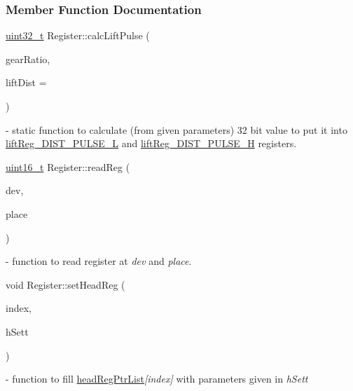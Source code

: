 {\subsubsection{Member Function Documentation}
\mbox{\label{classRegister_a72e4a0b4645d2afa608d263ece004dec}} 
{\footnotesize\ttfamily \mbox{\hyperlink{settings_8h_a4196118492a3b1493c81f250e90af775}{uint32\+\_\+t}} Register\+::\texorpdfstring{calc\+Lift\+Pulse}{calcLiftPulse} (\begin{DoxyParamCaption}\item[{\mbox{\hyperlink{settings_8h_a017dd44e68049ffdd31500a8cd01ba68}{uint16\+\_\+t}}}]{gear\+Ratio,  }\item[{\mbox{\hyperlink{settings_8h_a017dd44e68049ffdd31500a8cd01ba68}{uint16\+\_\+t}}}]{lift\+Dist = {} }\end{DoxyParamCaption})\hspace{0.3cm}{\ttfamily [static]}} - static function to calculate (from given parameters) 32 bit value to put it into \hyperlink{classRegister_a6b7cab4f601efc139a6589f92bdd97eaa3127f76d6d68960f34822218e5231d44}{lift\+Reg\+\_\+\+D\+I\+S\+T\+\_\+\+P\+U\+L\+S\+E\+\_\+L} and \hyperlink{classRegister_a6b7cab4f601efc139a6589f92bdd97eaa1f101c522eda2ec92173d127b93ae311}{lift\+Reg\+\_\+\+D\+I\+S\+T\+\_\+\+P\+U\+L\+S\+E\+\_\+H} registers.

\mbox{\label{classRegister_a5d9ef3f36154606c34d829e77daa1e32}} 
{\footnotesize\ttfamily \mbox{\hyperlink{settings_8h_a017dd44e68049ffdd31500a8cd01ba68}{uint16\+\_\+t}} Register\+::\texorpdfstring{read\+Reg}{readReg} (\begin{DoxyParamCaption}\item[{\mbox{\hyperlink{settings_8h_a48091a1e52849b0871df2f7081be2e38}{uint8\+\_\+t}}}]{dev,  }\item[{\mbox{\hyperlink{settings_8h_a48091a1e52849b0871df2f7081be2e38}{uint8\+\_\+t}}}]{place }\end{DoxyParamCaption})} - function to read register at \textit{dev} and \textit{place}.

\mbox{\label{classRegister_a844f6c43ab446e60d80fab2fff03442d}} 
{\footnotesize\ttfamily void Register\+::\texorpdfstring{set\+Head\+Reg}{setHeadReg} (\begin{DoxyParamCaption}\item[{int}]{index,  }\item[{\mbox{\hyperlink{classHeadSetting}{Head\+Setting}}}]{h\+Sett }\end{DoxyParamCaption})} - function to fill \hyperlink{classRegister_a380d6cf2ae7d1daf2233d1f3a4071426}{head\+Reg\+Ptr\+List}\textit{[index]} with parameters given in \textit{h\+Sett}

}
